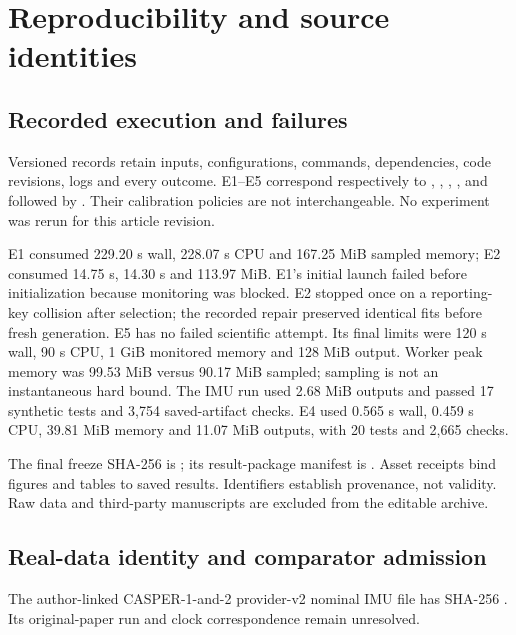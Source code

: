 \section{Reproducibility and source identities}\label{app:provenance}
\subsection{Recorded execution and failures}
Versioned records retain inputs, configurations, commands, dependencies, code revisions, logs and every outcome. E1--E5 correspond respectively to , , , , and  followed by . Their calibration policies are not interchangeable. No experiment was rerun for this article revision.

E1 consumed 229.20 s wall, 228.07 s CPU and 167.25 MiB sampled memory; E2 consumed 14.75 s, 14.30 s and 113.97 MiB. E1's initial launch failed before initialization because monitoring was blocked. E2 stopped once on a reporting-key collision after selection; the recorded repair preserved identical fits before fresh generation. E5 has no failed scientific attempt. Its final limits were 120 s wall, 90 s CPU, 1 GiB monitored memory and 128 MiB output. Worker peak memory was 99.53 MiB versus 90.17 MiB sampled; sampling is not an instantaneous hard bound. The IMU run used 2.68 MiB outputs and passed 17 synthetic tests and 3,754 saved-artifact checks. E4 used 0.565 s wall, 0.459 s CPU, 39.81 MiB memory and 11.07 MiB outputs, with 20 tests and 2,665 checks.

The final freeze SHA-256 is ; its result-package manifest is . Asset receipts bind figures and tables to saved results. Identifiers establish provenance, not validity. Raw data and third-party manuscripts are excluded from the editable archive.

\subsection{Real-data identity and comparator admission}
The author-linked CASPER-1-and-2 provider-v2 nominal IMU file has SHA-256 . Its original-paper run and clock correspondence remain unresolved.

